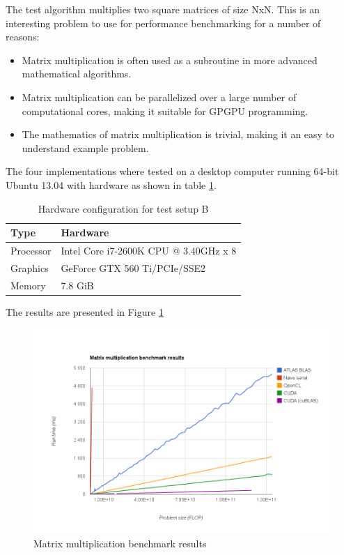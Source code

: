 The test algorithm multiplies two square matrices of size NxN. This is an interesting problem to use for performance benchmarking for a number of reasons:

\begin{itemize}
    \item Matrix multiplication is often used as a subroutine in more advanced mathematical algorithms.
    \item Matrix multiplication can be parallelized over a large number of computational cores, making it suitable for GPGPU programming.
    \item The mathematics of matrix multiplication is trivial, making it an easy to understand example problem.
\end{itemize}

The four implementations where tested on a desktop computer running 64-bit Ubuntu 13.04 with hardware as shown in table \ref{fig:hardware-spec-type-b}.

\begin{table}[ht]
\centering
    \begin{tabular}{ | l | l |}
    \hline
    \textbf{Type} & \textbf{Hardware} \\ \hline
    Processor & Intel Core i7-2600K CPU @ 3.40GHz x 8 \\ \hline
    Graphics & GeForce GTX 560 Ti/PCIe/SSE2 \\ \hline
    Memory & 7.8 GiB \\ \hline
    \end{tabular}
    \caption{Hardware configuration for test setup B}
    \label{fig:hardware-spec-type-b}
\end{table}

The results are presented in Figure \ref{fig:matrix-multiplication-benchmark-results}

\begin{figure}[ht!]
    \centering
    \includegraphics[width=120mm]{../gfx/matrix-multiplication-benchmark-results.png}
    \caption{Matrix multiplication benchmark results}
    \label{fig:matrix-multiplication-benchmark-results}
\end{figure}

